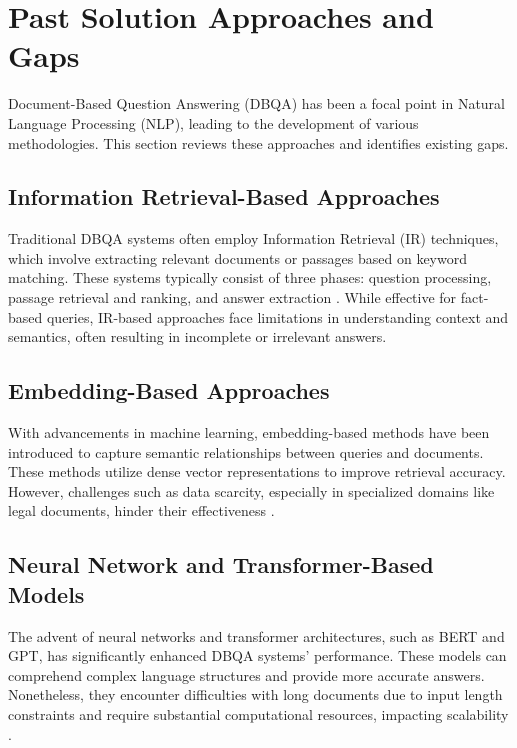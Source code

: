 \documentclass[sigconf]{acmart}
\begin{document}
\section{Past Solution Approaches and Gaps}

Document-Based Question Answering (DBQA) has been a focal point in Natural Language Processing (NLP), leading to the development of various methodologies. This section reviews these approaches and identifies existing gaps.

\subsection{Information Retrieval-Based Approaches}

Traditional DBQA systems often employ Information Retrieval (IR) techniques, which involve extracting relevant documents or passages based on keyword matching. These systems typically consist of three phases: question processing, passage retrieval and ranking, and answer extraction \cite{jurafsky2018question}. While effective for fact-based queries, IR-based approaches face limitations in understanding context and semantics, often resulting in incomplete or irrelevant answers.

\subsection{Embedding-Based Approaches}

With advancements in machine learning, embedding-based methods have been introduced to capture semantic relationships between queries and documents. These methods utilize dense vector representations to improve retrieval accuracy. However, challenges such as data scarcity, especially in specialized domains like legal documents, hinder their effectiveness \cite{limits_embedding_qa}.

\subsection{Neural Network and Transformer-Based Models}

The advent of neural networks and transformer architectures, such as BERT and GPT, has significantly enhanced DBQA systems' performance. These models can comprehend complex language structures and provide more accurate answers. Nonetheless, they encounter difficulties with long documents due to input length constraints and require substantial computational resources, impacting scalability \cite{li2020unified}.
\end{document}
